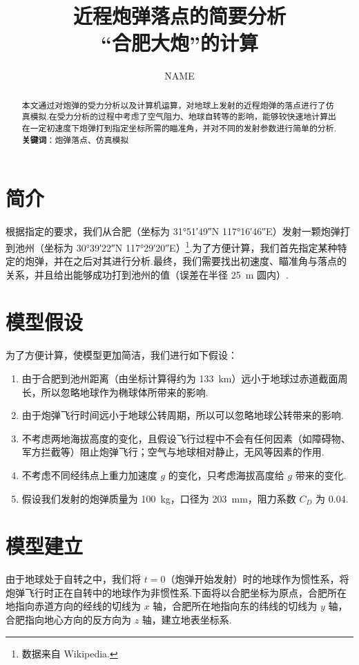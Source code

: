 \documentclass[UTF8]{ctexart}
\title{近程炮弹落点的简要分析\\ \large“合肥大炮”的计算}
\author{NAME}
\begin{document}
	\maketitle
	
	\begin{abstract}
	本文通过对炮弹的受力分析以及计算机运算，对地球上发射的近程炮弹的落点进行了仿真模拟.在受力分析的过程中考虑了空气阻力、地球自转等的影响，能够较快速地计算出在一定初速度下炮弹打到指定坐标所需的瞄准角，并对不同的发射参数进行简单的分析.
	\\
	\textbf{关键词}：炮弹落点、仿真模拟
	\end{abstract}
	
	\section{简介}
	根据指定的要求，我们从合肥（坐标为 \ang{31;51;49}N \ang{117;16;46}E）发射一颗炮弹打到池州（坐标为 \ang{30;39;22}N \ang{117;29;20}E）\footnote{数据来自 Wikipedia.}.为了方便计算，我们首先指定某种特定的炮弹，并在之后对其进行分析.最终，我们需要找出初速度、瞄准角与落点的关系，并且给出能够成功打到池州的值（误差在半径 \SI{25}{m} 圆内）.
	
	\section{模型假设}
	为了方便计算，使模型更加简洁，我们进行如下假设：
		\begin{enumerate}
			\item 由于合肥到池州距离（由坐标计算得约为 \SI{133}{km}）远小于地球过赤道截面周长，所以忽略地球作为椭球体所带来的影响.
			\item 由于炮弹飞行时间远小于地球公转周期，所以可以忽略地球公转带来的影响.
			\item 不考虑两地海拔高度的变化，且假设飞行过程中不会有任何因素（如障碍物、军方拦截等）阻止炮弹飞行；空气与地球相对静止，无风等因素的作用.
			\item 不考虑不同经纬点上重力加速度 $g$ 的变化，只考虑海拔高度给 $g$ 带来的变化.
			\item 假设我们发射的炮弹质量为 \SI{100}{kg}，口径为 \SI{203}{mm}，阻力系数 $C_D$ 为 0.04.
		\end{enumerate}
	\section{模型建立}
	由于地球处于自转之中，我们将 $t=0$（炮弹开始发射）时的地球作为惯性系，将炮弹飞行时正在自转中的地球作为非惯性系.下面将以合肥坐标为原点，合肥所在地指向赤道方向的经线的切线为 $x$ 轴，合肥所在地指向东的纬线的切线为 $y$ 轴，合肥指向地心方向的反方向为 $z$ 轴，建立地表坐标系.
\end{document}
